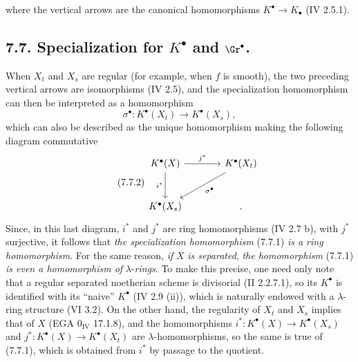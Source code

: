%

where the vertical arrows are the canonical homomorphisms \(K^{\bullet}\to K_\bullet\) (IV 2.5.1).

\subsection*{7.7. Specialization for \(K^\bullet\) and \(\Gr^\bullet\).}
When \(X_t\) and \(X_s\) are regular (for example, when \(f\) is smooth), the two preceding vertical arrows are isomorphisms (IV 2.5), and the specialization homomorphism can then be interpreted as a homomorphism
\begin{equation}\tag{7.7.1}
  \sigma^\bullet:K^\bullet(X_t)\longrightarrow K^\bullet(X_s),
\end{equation}
which can also be described as the unique homomorphism making the following diagram commutative
\begin{equation}\tag{7.7.2}
\begin{tikzcd}[column sep=large,row sep=large]
K^\bullet(X) \arrow[r,"j^*"] \arrow[d,"i^*"'] & K^\bullet(X_t) \arrow[dl,"\sigma^\bullet"]\\
K^\bullet(X_s) & {.}
\end{tikzcd}
\end{equation}
Since, in this last diagram, \(i^*\) and \(j^*\) are ring homomorphisms (IV 2.7 b), with \(j^*\) surjective, it follows that \emph{the specialization homomorphism} (7.7.1) \emph{is a ring homomorphism}. For the same reason, \emph{if} \(X\) \emph{is separated}, \emph{the homomorphism} (7.7.1) \emph{is even a homomorphism of} \(\lambda\)-\emph{rings}. To make this precise, one need only note that a regular separated noetherian scheme is divisorial (II 2.2.7.1), so its \(K^\bullet\) is identified with its ``naive'' \(K^\bullet\) (IV 2.9 (ii)), which is naturally endowed with a \(\lambda\)-ring structure (VI 3.2). On the other hand, the regularity of \(X_t\) and \(X_s\) implies that of \(X\) (EGA \(0_{\mathrm{IV}}\) 17.1.8), and the homomorphisms \(i^*:K^\bullet(X)\to K^\bullet(X_s)\) and \(j^*:K^\bullet(X)\to K^\bullet(X_t)\) are \(\lambda\)-homomorphisms, so the same is true of (7.7.1), which is obtained from \(i^*\) by passage to the quotient.

%

